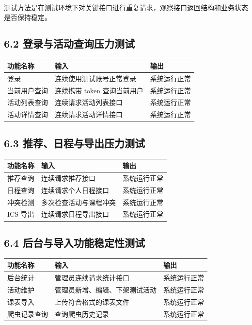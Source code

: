 测试方法是在测试环境下对关键接口进行重复请求，观察接口返回结构和业务状态是否保持稳定。

\subsection{6.2
登录与活动查询压力测试}\label{ux767bux5f55ux4e0eux6d3bux52a8ux67e5ux8be2ux538bux529bux6d4bux8bd5}

{\def\LTcaptype{none} %
\begin{longtable}[]{@{}|l|l|l|@{}}
\hline
\rowcolor{gray!12}
功能名称 & 输入 & 输出 \\
\hline
\endhead
\hline
\endlastfoot
登录 & 连续使用测试账号正常登录 & 系统运行正常 \\
\hline
当前用户查询 & 连续携带 token 查询当前用户 & 系统运行正常 \\
\hline
活动列表查询 & 连续请求活动列表接口 & 系统运行正常 \\
\hline
活动详情查询 & 连续请求活动详情接口 & 系统运行正常 \\
\hline
\end{longtable}
}

\subsection{6.3
推荐、日程与导出压力测试}\label{ux63a8ux8350ux65e5ux7a0bux4e0eux5bfcux51faux538bux529bux6d4bux8bd5}

{\def\LTcaptype{none} %
\begin{longtable}[]{@{}|l|l|l|@{}}
\hline
\rowcolor{gray!12}
功能名称 & 输入 & 输出 \\
\hline
\endhead
\hline
\endlastfoot
推荐查询 & 连续请求推荐接口 & 系统运行正常 \\
\hline
日程查询 & 连续请求个人日程接口 & 系统运行正常 \\
\hline
冲突检测 & 多次检查活动与课程冲突 & 系统运行正常 \\
\hline
ICS 导出 & 连续请求日程导出接口 & 系统运行正常 \\
\hline
\end{longtable}
}

\subsection{6.4
后台与导入功能稳定性测试}\label{ux540eux53f0ux4e0eux5bfcux5165ux529fux80fdux7a33ux5b9aux6027ux6d4bux8bd5}

{\def\LTcaptype{none} %
\begin{longtable}[]{@{}|l|l|l|@{}}
\hline
\rowcolor{gray!12}
功能名称 & 输入 & 输出 \\
\hline
\endhead
\hline
\endlastfoot
后台统计 & 管理员连续请求统计接口 & 系统运行正常 \\
\hline
活动维护 & 管理员新增、编辑、下架测试活动 & 系统运行正常 \\
\hline
课表导入 & 上传符合格式的课表文件 & 系统运行正常 \\
\hline
爬虫记录查询 & 查询爬虫历史记录 & 系统运行正常 \\
\hline
\end{longtable}
}

